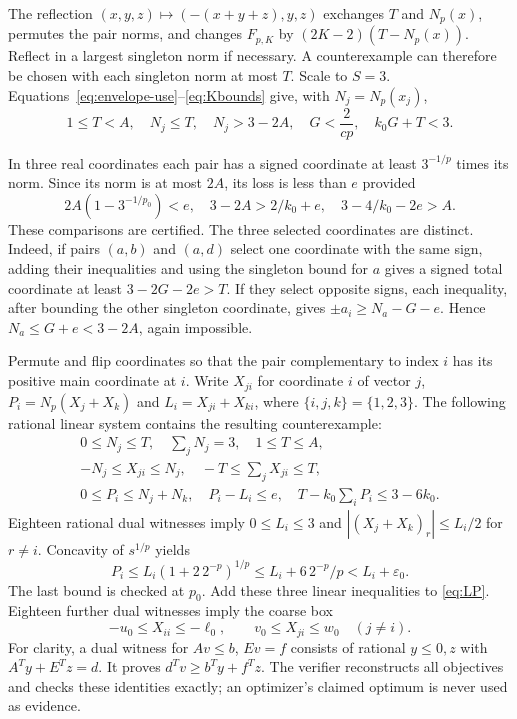 \documentclass[11pt,a4paper]{article}
\theoremstyle{remark}\newtheorem{remark}[theorem]{Remark}
\newcommand{\Np}{N_p}\newcommand{\F}{F_{p,K}}
\begin{document}
The reflection $(x,y,z)\mapsto(-(x+y+z),y,z)$ exchanges $T$ and
$\Np(x)$, permutes the pair norms, and changes $\F$ by
$(2K-2)(T-\Np(x))$. Reflect in a largest singleton norm if necessary.
A counterexample can therefore be chosen with each singleton norm at
most $T$. Scale to $S=3$. Equations~\eqref{eq:envelope-use}--\eqref{eq:Kbounds}
give, with $N_j=\Np(x_j)$,
\begin{equation}\label{eq:normal}
1\le T<A,\quad N_j\le T,\quad N_j>3-2A,\quad
G<\frac{2}{cp},\quad k_0G+T<3.
\end{equation}

In three real coordinates each pair has a signed coordinate at least
$3^{-1/p}$ times its norm. Since its norm is at most $2A$, its loss
is less than $e$ provided
\begin{equation}\label{eq:orientchecks}
2A(1-3^{-1/p_0})<e,\quad
3-2A>2/k_0+e,\quad 3-4/k_0-2e>A.
\end{equation}
These comparisons are certified. The three selected coordinates are
distinct. Indeed, if pairs $(a,b)$ and $(a,d)$ select one coordinate with
the same sign, adding their inequalities and using the singleton bound
for $a$ gives a signed total coordinate at least $3-2G-2e>T$.
If they select opposite signs, each inequality, after bounding the other
singleton coordinate, gives $\pm a_i\ge N_a-G-e$. Hence
$N_a\le G+e<3-2A$, again impossible.

Permute and flip coordinates so that the pair complementary to index $i$
has its positive main coordinate at $i$. Write $X_{ji}$ for coordinate
$i$ of vector $j$, $P_i=\Np(X_j+X_k)$ and $L_i=X_{ji}+X_{ki}$, where
$\{i,j,k\}=\{1,2,3\}$. The following rational linear system contains
the resulting counterexample:
\begin{equation}\label{eq:LP}
\begin{gathered}
0\le N_j\le T,\quad\sum_jN_j=3,\quad1\le T\le A,\\
-N_j\le X_{ji}\le N_j,\quad -T\le\sum_jX_{ji}\le T,\\
0\le P_i\le N_j+N_k,\quad P_i-L_i\le e,\quad
T-k_0\sum_iP_i\le3-6k_0.
\end{gathered}
\end{equation}
Eighteen rational dual witnesses imply $0\le L_i\le3$ and
$|(X_j+X_k)_r|\le L_i/2$ for $r\ne i$. Concavity of $s^{1/p}$ yields
\[
P_i\le L_i(1+2\,2^{-p})^{1/p}\le L_i+6\,2^{-p}/p<L_i+\varepsilon_0.
\]
The last bound is checked at $p_0$. Add these three linear inequalities
to \eqref{eq:LP}. Eighteen further dual witnesses imply the coarse box
\begin{equation}\label{eq:box0}
-u_0\le X_{ii}\le-\ell_0,\qquad v_0\le X_{ji}\le w_0\quad(j\ne i).
\end{equation}
For clarity, a dual witness for $Av\le b$, $Ev=f$ consists of rational
$y\le0,z$ with $A^Ty+E^Tz=d$. It proves $d^Tv\ge b^Ty+f^Tz$.
The verifier reconstructs all objectives and checks these identities
exactly; an optimizer's claimed optimum is never used as evidence.
\end{document}
